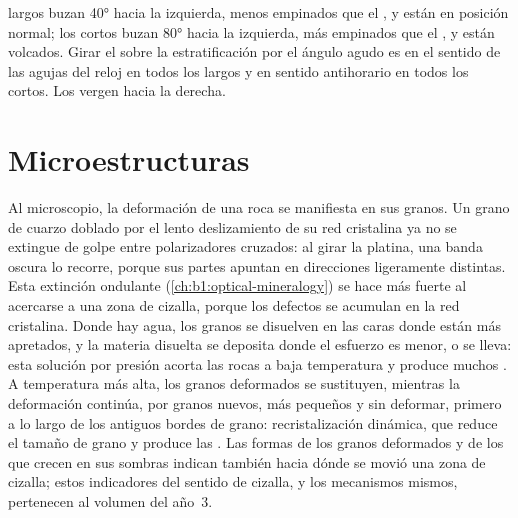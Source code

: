 \begin{omfigure}
{largos buzan \ang{40} hacia la izquierda, menos empinados que el , y están en posición normal; los  cortos buzan
\ang{80} hacia la izquierda, más empinados que el , y están volcados. Girar el  sobre la estratificación por el
ángulo agudo es en el sentido de las agujas del reloj en todos los  largos y en sentido antihorario en todos los 
cortos. Los  vergen hacia la derecha.}
\label{fig:b1:faults-folds-fabrics:vergence}
\end{omfigure}

\section{Microestructuras}\label{sec:b1:faults-folds-fabrics:micro}

Al microscopio, la deformación de una roca se manifiesta en sus granos. Un grano de cuarzo doblado por el lento deslizamiento de su
red cristalina ya no se extingue de golpe entre polarizadores cruzados: al girar la platina, una banda oscura lo recorre, porque
sus partes apuntan en direcciones ligeramente distintas. Esta extinción ondulante (\cref{ch:b1:optical-mineralogy}) se hace más
fuerte al acercarse a una zona de cizalla, porque los defectos se acumulan en la red cristalina. Donde hay agua, los granos se
disuelven en las caras donde están más apretados, y la materia disuelta se deposita donde el esfuerzo es menor, o se lleva: esta
solución por presión acorta las rocas a baja temperatura y produce muchos . A temperatura más alta, los granos deformados
se sustituyen, mientras la deformación continúa, por granos nuevos, más pequeños y sin deformar, primero a lo largo de los antiguos
bordes de grano: recristalización dinámica, que reduce el tamaño de grano y produce las . Las formas de los granos
deformados y de los  que crecen en sus sombras indican también hacia dónde se movió una zona de cizalla; estos indicadores
del sentido de cizalla, y los mecanismos mismos, pertenecen al volumen del año~3.

